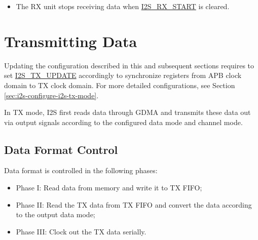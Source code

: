 \documentclass[main\_\_EN.tex]{subfiles}
\begin{document}
\begin{itemize}
\begin{itemize}
\begin{itemize}
            \item 1: The RX unit suspends data reception when the number of received bytes is greater than the value configured in \hyperref[regdesc:I2SRXEOFNUMREG]{I2S\_RX\_EOF\_NUM\_REG}. When \hyperref[fielddesc:I2SRXSTART]{I2S\_RX\_START} is not cleared, data reception can be restarted by setting \hyperref[fielddesc:I2SRXRESET]{I2S\_RX\_RESET} to 1.
            \item 2: The RX unit suspends data reception when \hyperref[fielddesc:I2SRXSTART]{I2S\_RX\_START} is cleared or GDMA RX FIFO is full. When \hyperref[fielddesc:I2SRXSTART]{I2S\_RX\_START} is not cleared and the GDMA RX FIFO is no longer full, data reception can be restarted by setting \hyperref[fielddesc:I2SRXRESET]{I2S\_RX\_RESET} to 1.
        \end{itemize}
        \item The RX unit stops receiving data when \hyperref[fielddesc:I2SRXSTART]{I2S\_RX\_START} is cleared.
    \end{itemize}
\end{itemize}

\section{Transmitting Data}\label{sec:i2s-tx-data}

\vspace{1em}
\begin{tiplisting}
Updating the configuration described in this and subsequent sections requires to set \hyperref[fielddesc:I2STXUPDATE]{I2S\_TX\_UPDATE} accordingly to synchronize registers from APB clock domain to TX clock domain. For more detailed configurations, see Section \ref{sec:i2s-configure-i2s-tx-mode}.
\end{tiplisting}

\vspace{-1em}
In TX mode, I2S first reads data through GDMA and transmits these data out via output signals according to the configured data mode and channel mode.
\subsection{Data Format Control}\label{sec:i2s-data-control}
Data format is controlled in the following phases:
\begin{itemize}
    \item Phase I: Read data from memory and write it to TX FIFO;
    \item Phase II: Read the TX data from TX FIFO and convert the data according to the output data mode;
    \item Phase III: Clock out the TX data serially.
\end{itemize}
\end{document}
